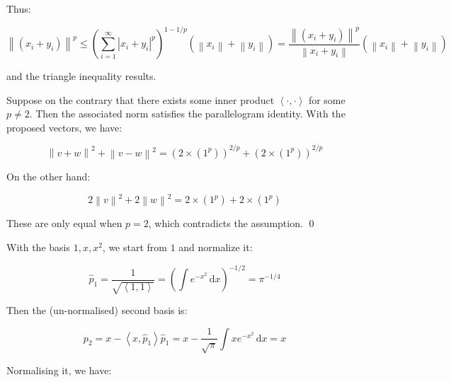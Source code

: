 \documentclass[12pt]{article}
\begin{document}
Thus:

\begin{equation}
    \left\lVert (x_{i} + y_{i}) \right\rVert^{p} \leq \left( \sum_{i = 1}^{\infty} \left\lvert x_{i} + y_{i} \right\rvert^{p} \right)^{1 - 1/p} \left( \left\lVert x_{i} \right\rVert + \left\lVert y_{i} \right\rVert \right) = \frac{\left\lVert (x_{i} + y_{i}) \right\rVert^{p}}{\left\lVert x_{i} + y_{i} \right\rVert} \left( \left\lVert x_{i} \right\rVert + \left\lVert y_{i} \right\rVert \right)
\end{equation}

and the triangle inequality results.

Suppose on the contrary that there exists some inner product $\left\langle \cdot, \cdot \right\rangle$ for some $p \ne 2$. Then the associated norm satisfies the parallelogram identity. With the proposed vectors, we have:

\begin{equation}
    \left\lVert v + w \right\rVert^{2} + \left\lVert v - w \right\rVert^{2} = \left( 2 \times (1^{p}) \right)^{2/p} + \left( 2 \times (1^{p}) \right)^{2/p}
\end{equation}

On the other hand:

\begin{equation}
    2 \left\lVert v \right\rVert^{2} + 2 \left\lVert w \right\rVert^{2} = 2 \times (1^{p}) + 2 \times (1^{p})
\end{equation}

These are only equal when $p = 2$, which contradicts the assumption.
\qed



With the basis $1, x, x^{2}$, we start from $1$ and normalize it:

\begin{equation}
    \hat{p}_{1} = \frac{1}{\sqrt{\left\langle 1, 1 \right\rangle}} = \left( \int e^{-x^{2}} \, \mathrm{d}x \right)^{-1/2} = \pi^{-1/4}
\end{equation}

Then the (un-normalised) second basis is:

\begin{equation}
    p_{2} = x - \left\langle x, \hat{p}_{1} \right\rangle \hat{p}_{1} = x - \frac{1}{\sqrt{\pi}} \int x e^{-x^{2}} \, \mathrm{d}x = x
\end{equation}

Normalising it, we have:
\end{document}
